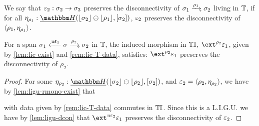 \begin{definition}
    We say that $\varepsilon_2 : \sigma_2 \to \sigma_3$ preserves the disconnectivity of $\sigma_1 \xrto{\rho_1} \sigma_2$ living in $\mathbb{T}$, 
    if for all $\mvarM_{\rho_1} : \dheapF(\concL{\sigma_2} \ominus \concL{\rho_1}, \anyL{\sigma_2})$,
        $\varepsilon_2$ preserves the disconnectivity of $\langle\rho_1, \eta_{\rho_1}\rangle$.
\end{definition}

\begin{lemma}
    For a span $\sigma_1 \xfrom{\tinstU\me_1} \sigma \xrto{\rho_2} \sigma_2$ in $\mathbb{T}$,
    the induced morphism in ${\mathbb{T}\mathbb{I}}$, $\ext^{\rho_2}{\me_1}$, given by \cref{lem:lic-exist} and \cref{rem:lic-T-data},
    satisfies: $\ext^{\rho_2}{\me_1}$ preserves the disconnectivity of $\rho_2$.
\end{lemma}
\begin{proof}
    For some $\mvarM_{\rho_2} : \dheapF(\concL{\sigma_2} \ominus \concL{\rho_2}, \anyL{\sigma_2})$, and $\varepsilon_2 = \langle\rho_2, \eta_{\rho_2}\rangle$,
    we have by \cref{lem:ligu-rmono-exist} that
    with data given by \cref{rem:lic-T-data} commutes in ${\mathbb{T}\mathbb{I}}$. 
    Since this is a L.I.G.U. we have by \cref{lem:ligu-dcon} that $\ext^{\tinstU\me_2}\me_1$ preserves the disconnectivity of $\varepsilon_2$.
\end{proof}

